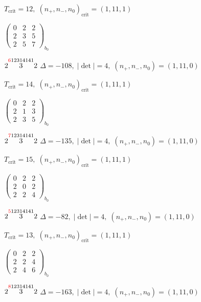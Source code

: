 \documentclass[10pt]{article}
\begin{document}
\hspace{1em}$T_{\text{crit}}=12,\; (n_+,n_-,n_0)_{\text{crit}}=(1,11,1)$

\hspace{2em}$\left(\begin{smallmatrix}0 & 2 & 2 \\ 2 & 3 & 5 \\ 2 & 5 & 7\end{smallmatrix}\right)_{\!b_0}$

\smallskip

$2\overset{\textcolor{red}{6}12314141}{3}2$ \quad $\Delta=-108,\; |\det|=4,\; (n_+,n_-,n_0)=(1,11,0)$

\hspace{1em}$T_{\text{crit}}=14,\; (n_+,n_-,n_0)_{\text{crit}}=(1,11,1)$

\hspace{2em}$\left(\begin{smallmatrix}0 & 2 & 2 \\ 2 & 1 & 3 \\ 2 & 3 & 5\end{smallmatrix}\right)_{\!b_0}$

$2\overset{\textcolor{red}{7}12314141}{3}2$ \quad $\Delta=-135,\; |\det|=4,\; (n_+,n_-,n_0)=(1,11,0)$

\hspace{1em}$T_{\text{crit}}=15,\; (n_+,n_-,n_0)_{\text{crit}}=(1,11,1)$

\hspace{2em}$\left(\begin{smallmatrix}0 & 2 & 2 \\ 2 & 0 & 2 \\ 2 & 2 & 4\end{smallmatrix}\right)_{\!b_0}$

$2\overset{\textcolor{red}{5}12314141}{3}2$ \quad $\Delta=-82,\; |\det|=4,\; (n_+,n_-,n_0)=(1,11,0)$

\hspace{1em}$T_{\text{crit}}=13,\; (n_+,n_-,n_0)_{\text{crit}}=(1,11,1)$

\hspace{2em}$\left(\begin{smallmatrix}0 & 2 & 2 \\ 2 & 2 & 4 \\ 2 & 4 & 6\end{smallmatrix}\right)_{\!b_0}$

$2\overset{\textcolor{red}{8}12314141}{3}2$ \quad $\Delta=-163,\; |\det|=4,\; (n_+,n_-,n_0)=(1,11,0)$
\end{document}
